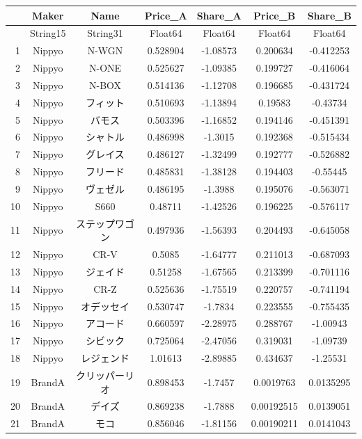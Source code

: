 \documentclass[
  letterpaper,
  DIV=11,
  numbers=noendperiod]{scrreprt}
\begin{document}
\begin{tabular}{r|cccccc}
    & Maker & Name & Price\_A & Share\_A & Price\_B & Share\_B\\
    \hline
    & String15 & String31 & Float64 & Float64 & Float64 & Float64\\
    \hline
    1 & Nippyo & N-WGN & 0.528904 & -1.08573 & 0.200634 & -0.412253 \\
    2 & Nippyo & N-ONE & 0.525627 & -1.09385 & 0.199727 & -0.416064 \\
    3 & Nippyo & N-BOX & 0.514136 & -1.12708 & 0.196685 & -0.431724 \\
    4 & Nippyo & フィット & 0.510693 & -1.13894 & 0.19583 & -0.43734 \\
    5 & Nippyo & バモス & 0.503396 & -1.16852 & 0.194146 & -0.451391 \\
    6 & Nippyo & シャトル & 0.486998 & -1.3015 & 0.192368 & -0.515434 \\
    7 & Nippyo & グレイス & 0.486127 & -1.32499 & 0.192777 & -0.526882 \\
    8 & Nippyo & フリード & 0.485831 & -1.38128 & 0.194403 & -0.55445 \\
    9 & Nippyo & ヴェゼル & 0.486195 & -1.3988 & 0.195076 & -0.563071 \\
    10 & Nippyo & S660 & 0.48711 & -1.42526 & 0.196225 & -0.576117 \\
    11 & Nippyo & ステップワゴン & 0.497936 & -1.56393 & 0.204493 & -0.645058 \\
    12 & Nippyo & CR-V & 0.5085 & -1.64777 & 0.211013 & -0.687093 \\
    13 & Nippyo & ジェイド & 0.51258 & -1.67565 & 0.213399 & -0.701116 \\
    14 & Nippyo & CR-Z & 0.525636 & -1.75519 & 0.220757 & -0.741194 \\
    15 & Nippyo & オデッセイ & 0.530747 & -1.7834 & 0.223555 & -0.755435 \\
    16 & Nippyo & アコード & 0.660597 & -2.28975 & 0.288767 & -1.00943 \\
    17 & Nippyo & シビック & 0.725064 & -2.47056 & 0.319031 & -1.09739 \\
    18 & Nippyo & レジェンド & 1.01613 & -2.89885 & 0.434637 & -1.25531 \\
    19 & BrandA & クリッパーリオ & 0.898453 & -1.7457 & 0.0019763 & 0.0135295 \\
    20 & BrandA & デイズ & 0.869238 & -1.7888 & 0.00192515 & 0.0139051 \\
    21 & BrandA & モコ & 0.856046 & -1.81156 & 0.00190211 & 0.0141043 \\

\end{tabular}
\end{document}
